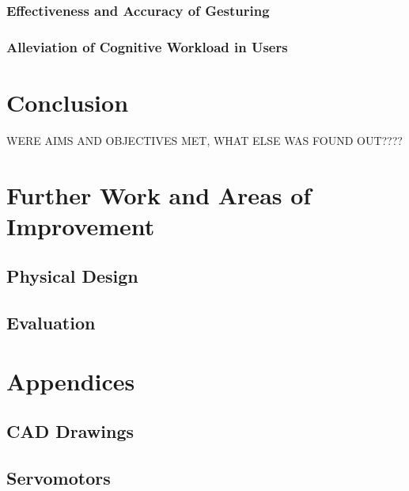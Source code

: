 \documentclass[11pt]{article}
\begin{document}
\subsubsection{Effectiveness and Accuracy of Gesturing}
\subsubsection{Alleviation of Cognitive Workload in Users}


\section{Conclusion}
WERE AIMS AND OBJECTIVES MET, WHAT ELSE WAS FOUND OUT????
\section{Further Work and Areas of Improvement}
\subsection{Physical Design}
\subsection{Evaluation}

\pagebreak



\pagebreak
\section{Appendices}
\subsection{CAD Drawings}
\subsection{Servomotors}
\end{document}
